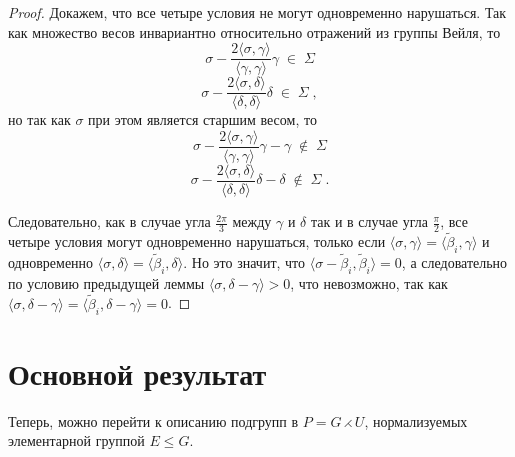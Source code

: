 \documentclass[12pt]{matmex-diploma}
\theoremstyle{mystyleni}
\theoremstyle{mystyle}
\renewcommand{\le}{\leqslant}
\begin{document}
\begin{proof} Докажем, что все четыре условия не могут одновременно нарушаться.
Так как множество весов инвариантно относительно отражений из группы Вейля, то
$$ \sigma - \frac{2 \langle \sigma,\gamma\rangle}{\langle \gamma , \gamma \rangle}\gamma \;\in\; \Sigma $$
$$ \sigma - \frac{2 \langle \sigma,\delta\rangle}{\langle \delta , \delta \rangle}\delta \;\in\; \Sigma \; , $$
но так как $\sigma$ при этом является старшим весом, то
$$ \sigma - \frac{2 \langle \sigma,\gamma\rangle}{\langle \gamma , \gamma \rangle}\gamma-\gamma \;\notin\; \Sigma $$
$$ \sigma - \frac{2 \langle \sigma,\delta\rangle}{\langle \delta , \delta \rangle}\delta-\delta \;\notin\; \Sigma \; . $$

Следовательно, как в случае угла $\frac{2\pi}{3}$ между $\gamma$ и $\delta$ так и в случае угла $\frac{\pi}{2}$, все четыре условия могут одновременно нарушаться, только если $\langle\sigma,\gamma\rangle=\langle\widetilde\beta_i,\gamma\rangle$
и одновременно $\langle\sigma,\delta\rangle=\langle\widetilde\beta_i,\delta\rangle$. Но это значит, что $\langle\sigma-\widetilde\beta_i,\widetilde\beta_i\rangle=0$,
а следовательно по условию предыдущей леммы $\langle\sigma,\delta-\gamma\rangle > 0$, что невозможно, так как $\langle\sigma,\delta-\gamma\rangle = \langle\widetilde\beta_i,\delta-\gamma\rangle = 0$.
\end{proof}

\section{Основной результат}

Теперь, можно перейти к описанию подгрупп в $P=G\rightthreetimes U$, нормализуемых элементарной группой $E\le G$.
\end{document}
